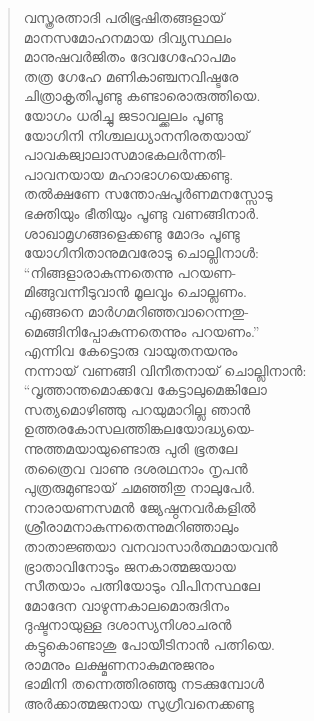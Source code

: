 \begin{verse}
വസ്ത്രരത്നാദി പരിഭൂഷിതങ്ങളായ്\\
മാനസമോഹനമായ ദിവ്യസ്ഥലം\\
മാനുഷവര്‍ജിതം ദേവഗേഹോപമം\\
തത്ര ഗേഹേ മണികാഞ്ചനവിഷ്ടരേ\\
ചിത്രാകൃതിപൂണ്ടു കണ്ടാരൊരുത്തിയെ.\\
യോഗം ധരിച്ചു ജടാവല്ക്കലം പൂണ്ടു\\
യോഗിനി നിശ്ചലധ്യാനനിരതയായ്\\
പാവകജ്വാലാസമാഭകലര്‍ന്നതി-\\
പാവനയായ മഹാഭാഗയെക്കണ്ടു.\\
തല്‍ക്ഷണേ സന്തോഷപൂര്‍ണമനസ്സോടു\\
ഭക്തിയും ഭീതിയും പൂണ്ടു വണങ്ങിനാര്‍.\\
ശാഖാമൃഗങ്ങളെക്കണ്ടു മോദം പൂണ്ടു\\
യോഗിനിതാനുമവരോടു ചൊല്ലിനാള്‍:\\
“നിങ്ങളാരാകുന്നതെന്നു പറയണ-\\
മിങ്ങുവന്നീടുവാന്‍ മൂലവും ചൊല്ലണം.\\
എങ്ങനെ മാര്‍ഗമറിഞ്ഞവാറെന്നതു-\\
മെങ്ങിനിപ്പോകുന്നതെന്നും പറയണം.”\\
എന്നിവ കേട്ടൊരു വായുതനയനും\\
നന്നായ് വണങ്ങി വിനീതനായ് ചൊല്ലിനാന്‍:\\
“വൃത്താന്തമൊക്കവേ കേട്ടാലുമെങ്കിലോ\\
സത്യമൊഴിഞ്ഞു പറയുമാറില്ല ഞാന്‍\\
ഉത്തരകോസലത്തിങ്കലയോദ്ധ്യയെ-\\
ന്നുത്തമയായുണ്ടൊരു പുരി ഭൂതലേ\\
തത്രൈവ വാണു ദശരഥനാം നൃപന്‍\\
പുത്രരുമുണ്ടായ് ചമഞ്ഞിതു നാലുപേര്‍.\\
നാരായണസമന്‍ ജ്യേഷ്ഠനവര്‍കളില്‍\\
ശ്രീരാമനാകുന്നതെന്നുമറിഞ്ഞാലും\\
താതാജ്ഞയാ വനവാസാര്‍ത്ഥമായവന്‍\\
ഭ്രാതാവിനോടും ജനകാത്മജയായ\\
സീതയാം പത്നിയോടും വിപിനസ്ഥലേ\\
മോദേന വാഴുന്നകാലമൊരുദിനം\\
ദുഷ്ടനായുള്ള ദശാസ്യനിശാചരന്‍\\
കട്ടുകൊണ്ടാശു പോയീടിനാന്‍ പത്നിയെ.\\
രാമനും ലക്ഷ്മണനാകുമനുജനും\\
ഭാമിനി തന്നെത്തിരഞ്ഞു നടക്കുമ്പോള്‍\\
അര്‍ക്കാത്മജനായ സുഗ്രീവനെക്കണ്ടു\\

\end{verse}
